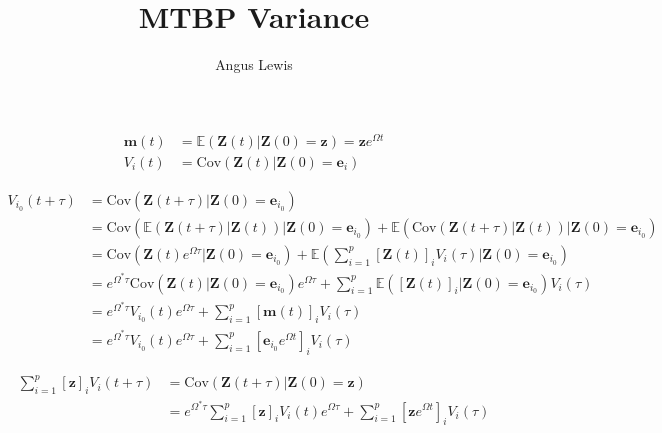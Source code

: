 \documentclass{article}
\title{MTBP Variance}
\author{Angus Lewis}
\begin{document}
\maketitle
\newcommand{\Cov}[1]{\mathrm{Cov}\left(#1\right)}
\newcommand{\Var}[1]{\mathrm{Var}\left(#1\right)}
\newcommand{\Ex}[1]{\mathbb{E}\left(#1\right)}
\newcommand{\Prob}[1]{\mathbb{P}\left(#1\right)}
\newcommand{\Exp}[1]{e^{#1}}
\newcommand{\bs}[1]{\boldsymbol{#1}}
\newcommand{\direction}[1]{\bs{e}_{#1}}
\newcommand{\tr}{^{*}}
\newcommand{\Matrix}[2]{\left[\begin{array}{#1}#2\end{array}\right]}
\newcommand{\diag}[1]{\mathrm{diag}\left(#1\right)}

\begin{align}
    \bs m(t) &= \Ex{\bs Z(t)|\bs Z(0)=\bs z} = \bs z \Exp{\Omega t}
    \\ V_i(t) &= \Cov{\bs Z(t)|\bs Z(0)=\direction{i}} 
\end{align}

\begin{align}
    V_{i_0}(t+\tau) &= \Cov{\bs Z(t+\tau)|\bs Z(0)=\direction{i_0}} 
    \\&=\Cov{\Ex{\bs Z(t+\tau)|\bs Z(t)}|\bs Z(0)=\direction{i_0}}   
    + \Ex{\Cov{\bs Z(t+\tau)|\bs Z(t)}|\bs Z(0)=\direction{i_0}}
    \\&=\Cov{\bs Z(t) \Exp{\Omega \tau}|\bs Z(0)=\direction{i_0}}   
    + \Ex{\sum_{i=1}^p \left[\bs Z(t)\right]_i V_i(\tau)|\bs Z(0)=\direction{i_0}}
    \\&=\Exp{\Omega\tr \tau}\Cov{\bs Z(t)|\bs Z(0)=\direction{i_0}}\Exp{\Omega \tau}
    + \sum_{i=1}^p \Ex{\left[\bs Z(t)\right]_i|\bs Z(0)=\direction{i_0}} V_i(\tau)
    \\&=\Exp{\Omega\tr \tau}V_{i_0}(t)\Exp{\Omega \tau}
    + \sum_{i=1}^p \left[\bs m(t)\right]_i V_i(\tau)
    \\&=\Exp{\Omega\tr \tau}V_{i_0}(t)\Exp{\Omega \tau}
    + \sum_{i=1}^p \left[\direction{i_0}\Exp{\Omega t}\right]_i V_i(\tau)
\end{align}

\begin{align}
    \sum_{i=1}^p \left[\bs z\right]_i V_i(t+\tau) &= \Cov{\bs Z(t+\tau)|\bs Z(0)=\bs z} 
    \\&=\Exp{\Omega\tr \tau}\sum_{i=1}^p \left[\bs z\right]_i V_{i}(t)\Exp{\Omega \tau}
    + \sum_{i=1}^p \left[\bs z\Exp{\Omega t}\right]_i V_i(\tau)
\end{align}
\end{document}

